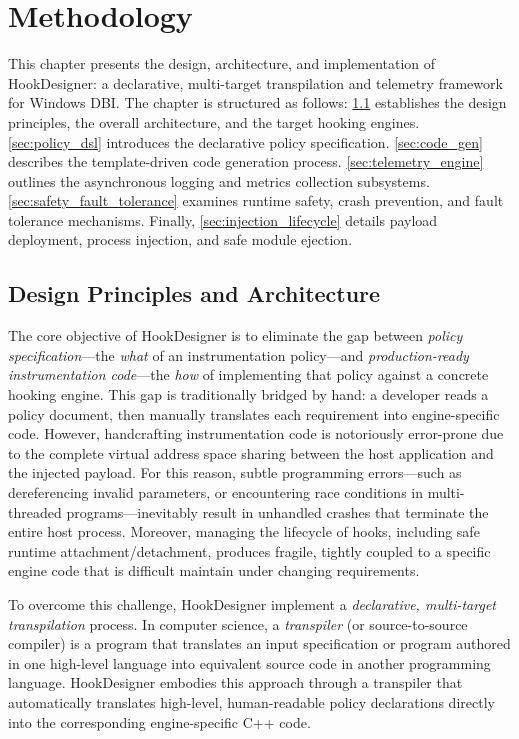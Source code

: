\chapter{Methodology}
\label{ch:method}

This chapter presents the design, architecture, and implementation of HookDesigner: a declarative, multi-target transpilation and telemetry framework for Windows \ac{DBI}.
The chapter is structured as follows:
\cref{sec:arch_overview} establishes the design principles, the overall architecture, and the target hooking engines.
\cref{sec:policy_dsl} introduces the declarative policy specification.
\cref{sec:code_gen} describes the template-driven code generation process.
\cref{sec:telemetry_engine} outlines the asynchronous logging and metrics collection subsystems.
\cref{sec:safety_fault_tolerance} examines runtime safety, crash prevention, and fault tolerance mechanisms.
Finally, \cref{sec:injection_lifecycle} details payload deployment, process injection, and safe module ejection.

\section{Design Principles and Architecture}
\label{sec:arch_overview}

The core objective of HookDesigner is to eliminate the gap between \emph{policy specification}---the \emph{what} of an instrumentation policy---and \emph{production-ready instrumentation code}---the \emph{how} of implementing that policy against a concrete hooking engine.
This gap is traditionally bridged by hand: a developer reads a policy document, then manually translates each requirement into engine-specific code.
However, handcrafting instrumentation code is notoriously error-prone due to the complete virtual address space sharing between the host application and the injected payload.
For this reason, subtle programming errors---such as dereferencing invalid parameters, or encountering race conditions in multi-threaded programs---inevitably result in unhandled crashes that terminate the entire host process.
Moreover, managing the lifecycle of hooks, including safe runtime attachment/detachment, produces fragile, tightly coupled to a specific engine code that is difficult maintain under changing requirements.

To overcome this challenge, HookDesigner implement a \emph{declarative, multi-target transpilation} process.
In computer science, a \emph{transpiler} (or source-to-source compiler) is a program that translates an input specification or program authored in one high-level language into equivalent source code in another programming language.
HookDesigner embodies this approach through a transpiler that automatically translates high-level, human-readable policy declarations directly into the corresponding engine-specific C++ code.

